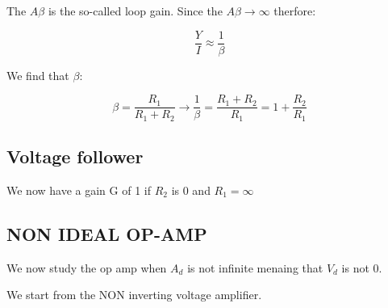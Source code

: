 \documentclass[../main.tex]{subfiles}
\begin{document}
The $A\beta$ is the so-called loop gain.
Since the $A\beta \rightarrow \infty$ therfore:

\begin{equation}
	\frac{Y}{I} \approx \frac{1}{\beta}
\end{equation}

We find that $\beta$:

\begin{equation}
	\beta = \frac{R_1}{R_1 + R_2} \rightarrow \frac{1}{\beta} = \frac{R_1+ R_2}{R_1} = 1 + \frac{R_2}{R_1}
\end{equation}


\subsection{Voltage follower}

We now have a gain G of 1 if $R_2$ is 0 and $R_1 = \infty$



\subsection{NON IDEAL OP-AMP}

We now study the op amp when $A_d$ is not infinite menaing that $V_d$ is not 0.


\vspace*{10cm}


We start from the NON inverting voltage amplifier.








\end{document}
